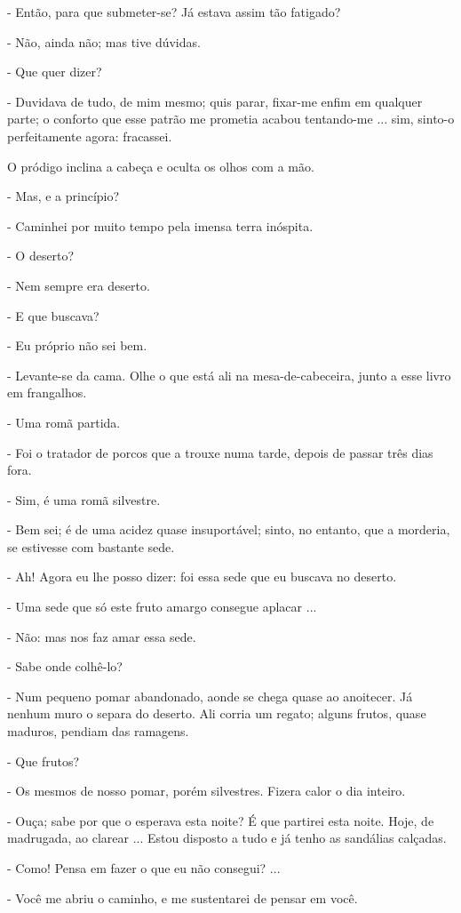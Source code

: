 - Então, para que submeter-se? Já estava assim tão fatigado?

- Não, ainda não; mas tive dúvidas.

- Que quer dizer?

- Duvidava de tudo, de mim mesmo; quis parar, fixar-me enfim em qualquer
parte; o conforto que esse patrão me prometia acabou tentando-me ...
sim, sinto-o perfeitamente agora: fracassei.

O pródigo inclina a cabeça e oculta os olhos com a mão.

- Mas, e a princípio?

- Caminhei por muito tempo pela imensa terra inóspita.

- O deserto?

- Nem sempre era deserto.

- E que buscava?

- Eu próprio não sei bem.

- Levante-se da cama. Olhe o que está ali na mesa-de-cabeceira, junto a
esse livro em frangalhos.

- Uma romã partida.

- Foi o tratador de porcos que a trouxe numa tarde, depois de passar
três dias fora.

- Sim, é uma romã silvestre.

- Bem sei; é de uma acidez quase insuportável; sinto, no entanto, que a
morderia, se estivesse com bastante sede.

- Ah! Agora eu lhe posso dizer: foi essa sede que eu buscava no deserto.

- Uma sede que só este fruto amargo consegue aplacar ...

- Não: mas nos faz amar essa sede.

- Sabe onde colhê-lo?

- Num pequeno pomar abandonado, aonde se chega quase ao anoitecer. Já
nenhum muro o separa do deserto. Ali corria um regato; alguns frutos,
quase maduros, pendiam das ramagens.

- Que frutos?

- Os mesmos de nosso pomar, porém silvestres. Fizera calor o dia
inteiro.

- Ouça; sabe por que o esperava esta noite? É que partirei esta noite.
Hoje, de madrugada, ao clarear ... Estou disposto a tudo e já tenho as
sandálias calçadas.

- Como! Pensa em fazer o que eu não consegui? ...

- Você me abriu o caminho, e me sustentarei de pensar em você.

